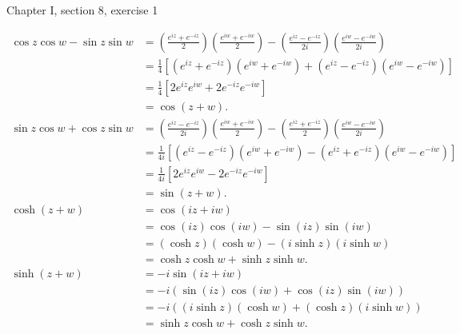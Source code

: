 \documentclass{article}
\begin{document}
\bigskip
\par
\begin{prob}
    Chapter I, section 8, exercise 1
\end{prob}
\begin{align*}
    \cos z \cos w - \sin z \sin w &= \left( \frac{e^{iz}+e^{-iz}}{2} \right) \left( \frac{e^{iw}+e^{-iw}}{2} \right) - \left( \frac{e^{iz}-e^{-iz}}{2i} \right) \left( \frac{e^{iw}-e^{-iw}}{2i} \right) \\
                                  &= \frac{1}{4} \left[ (e^{iz}+e^{-iz})(e^{iw}+e^{-iw})+(e^{iz}-e^{-iz})(e^{iw}-e^{-iw}) \right] \\
                                  &= \frac{1}{4} \left[ 2e^{iz}e^{iw} + 2e^{-iz}e^{-iw} \right] \\
                                  &= \cos (z+w). \\
    \sin z \cos w + \cos z \sin w &= \left( \frac{e^{iz}-e^{-iz}}{2i} \right) \left( \frac{e^{iw}+e^{-iw}}{2} \right) - \left( \frac{e^{iz}+e^{-iz}}{2} \right) \left( \frac{e^{iw}-e^{-iw}}{2i} \right) \\
                                  &= \frac{1}{4i} \left[ (e^{iz}-e^{-iz})(e^{iw}+e^{-iw})-(e^{iz}+e^{-iz})(e^{iw}-e^{-iw}) \right] \\
                                  &= \frac{1}{4i} \left[ 2e^{iz}e^{iw} - 2e^{-iz}e^{-iw} \right] \\
                                  &= \sin (z+w). \\
    \cosh (z+w) &= \cos(iz+iw) \\
                &= \cos(iz)\cos(iw)-\sin(iz)\sin(iw) \\
                &= (\cosh z) (\cosh w) - (i \sinh z)(i \sinh w) \\
                &= \cosh z \cosh w + \sinh z \sinh w. \\
    \sinh(z+w) &= -i \sin(iz+iw) \\
               &= -i \left( \sin(iz)\cos(iw) + \cos(iz)\sin(iw) \right) \\
               &= -i \left( (i \sinh z)(\cosh w) + (\cosh z)(i \sinh w) \right) \\
               &= \sinh z \cosh w + \cosh z \sinh w.
\end{align*}
\end{document}
